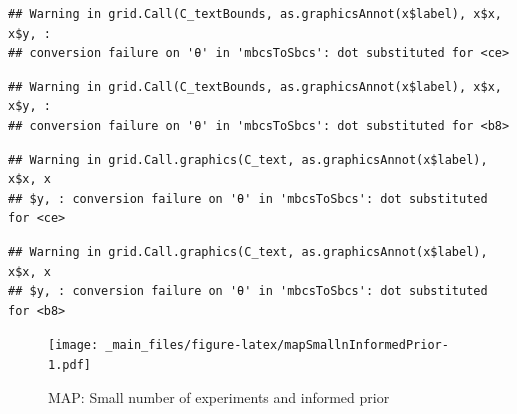 \documentclass[]{book}
\theoremstyle{definition}
\theoremstyle{definition}
\theoremstyle{definition}
\theoremstyle{remark}
\begin{document}
\begin{verbatim}
## Warning in grid.Call(C_textBounds, as.graphicsAnnot(x$label), x$x, x$y, :
## conversion failure on 'θ' in 'mbcsToSbcs': dot substituted for <ce>
\end{verbatim}

\begin{verbatim}
## Warning in grid.Call(C_textBounds, as.graphicsAnnot(x$label), x$x, x$y, :
## conversion failure on 'θ' in 'mbcsToSbcs': dot substituted for <b8>
\end{verbatim}

\begin{verbatim}
## Warning in grid.Call.graphics(C_text, as.graphicsAnnot(x$label), x$x, x
## $y, : conversion failure on 'θ' in 'mbcsToSbcs': dot substituted for <ce>
\end{verbatim}

\begin{verbatim}
## Warning in grid.Call.graphics(C_text, as.graphicsAnnot(x$label), x$x, x
## $y, : conversion failure on 'θ' in 'mbcsToSbcs': dot substituted for <b8>
\end{verbatim}

\begin{figure}
\centering
\texttt{[image: \_main\_files/figure-latex/mapSmallnInformedPrior-1.pdf]}
\caption{\label{fig:mapSmallnInformedPrior}MAP: Small number of experiments
and informed prior}
\end{figure}
\end{document}
